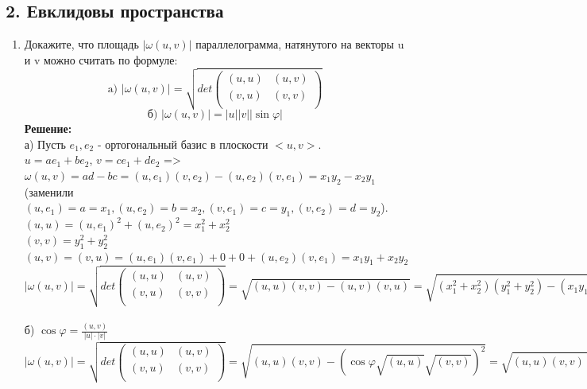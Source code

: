 \documentclass[]{book}
\theoremstyle{definition}
\begin{document}
\subsection*{2. Евклидовы пространства}

\begin{enumerate}[resume]


\item Докажите, что площадь $|\omega(u, v)|$ параллелограмма, натянутого на векторы u и v можно считать по формуле:
$$\text{a) \ } |\omega (u, v)| = \sqrt{det \begin{pmatrix}
(u, u)  &  (u,v) \\
(v, u)  &  (v, v)\\
\end{pmatrix}} $$
$$\text{б) \ } |\omega (u, v)| = |u||v||\sin{\varphi}| $$
\textbf{Решение:}\\
а) Пусть $e_1, e_2$ - ортогональный базис в плоскости $<u, v>$. \\
$u = ae_1 + be_2$, $v = ce_1 + de_2$ => $\omega(u, v) = ad - bc = (u, e_1)(v, e_2) - (u, e_2)(v, e_1) = x_1y_2 - x_2y_1$ (заменили $(u, e_1) = a = x_1, (u, e_2) = b = x_2, (v, e_1) = c = y_1, (v, e_2) = d = y_2$).\\
$(u, u) = (u, e_1)^2 + (u, e_2)^2 = x_{1}^2 + x_{2}^2$\\
$(v, v) = y_{1}^2 + y_{2}^2$\\
$(u, v) = (v, u) = (u, e_1)(v, e_1) + 0 + 0 + (u, e_2)(v, e_1) = x_1y_1 + x_2y_2$\\
$$|\omega (u, v)| = \sqrt{det \begin{pmatrix}
(u, u)  &  (u,v) \\
(v, u)  &  (v, v)\\
\end{pmatrix}}  = \sqrt{(u,u)(v,v) - (u,v)(v,u)} = \sqrt{(x_{1}^2 + x_{2}^2)(y_{1}^2 + y_{2}^2) - (x_1y_1 + x_2y_2)^2} = x_1y_2 - x_2y_1$$ \\
б) $\cos{\varphi} = \frac{(u, v)}{|u|\cdot |v|}$\\
$$|\omega (u, v)| = \sqrt{det \begin{pmatrix}
(u, u)  &  (u,v) \\
(v, u)  &  (v, v)\\
\end{pmatrix}}  = \sqrt{(u, u)(v, v) - (\cos{\varphi} \sqrt{(u, u)} \sqrt{(v, v)})^2} = \sqrt{(u, u)(v, v)(\sin{\varphi})^2} = |u| |v| |\sin{\varphi}|.$$







\end{enumerate}
\end{document}
